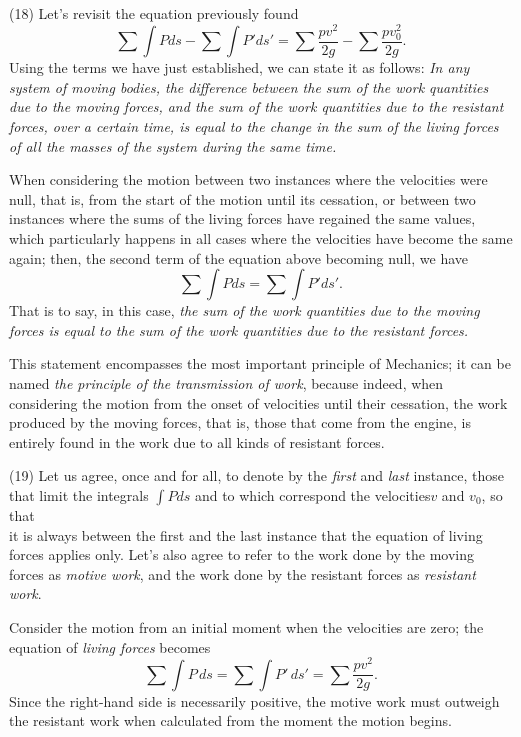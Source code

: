 \documentclass{book}
\begin{document}
(18) Let's revisit the equation previously found
\begin{equation}
    \sum \int Pds - \sum \int P'ds' = \sum \frac{pv^2}{2g} - \sum \frac{pv_0^2}{2g}.
\end{equation}
Using the terms we have just established, we can state it as follows: \textit{In any system of moving bodies, the difference between the sum of the work quantities due to the moving forces, and the sum of the work quantities due to the resistant forces, over a certain time, is equal to the change in the sum of the living forces of all the masses of the system during the same time.}

When considering the motion between two instances where the velocities were null, that is, from the start of the motion until its cessation, or between two instances where the sums of the living forces have regained the same values, which particularly happens in all cases where the velocities have become the same again; then, the second term of the equation above becoming null, we have
\begin{equation}
    \sum \int Pds = \sum \int P'ds'.
\end{equation}
That is to say, in this case, \textit{the sum of the work quantities due to the moving forces is equal to the sum of the work quantities due to the resistant forces.}

This statement encompasses the most important principle of Mechanics; it can be named \textit{the principle of the transmission of work}, because indeed, when considering the motion from the onset of velocities until their cessation, the work produced by the moving forces, that is, those that come from the engine, is entirely found in the work due to all kinds of resistant forces.

(19) Let us agree, once and for all, to denote by the \textit{first} and \textit{last} instance, those that limit the integrals \(\int Pds\) and to which correspond the velocities\(v\) and \(v_0\), so that 
\\
it is always between the first and the last instance that the equation of living forces applies only. Let's also agree to refer to the work done by the moving forces as \textit{motive work}, and the work done by the resistant forces as \textit{resistant work}.

Consider the motion from an initial moment when the velocities are zero; the equation of \textit{living forces} becomes
\[\sum \int P \, ds = \sum \int P' \, ds' = \sum \frac{pv^2}{2g} .\]
Since the right-hand side is necessarily positive, the motive work must outweigh the resistant work when calculated from the moment the motion begins.
\end{document}
